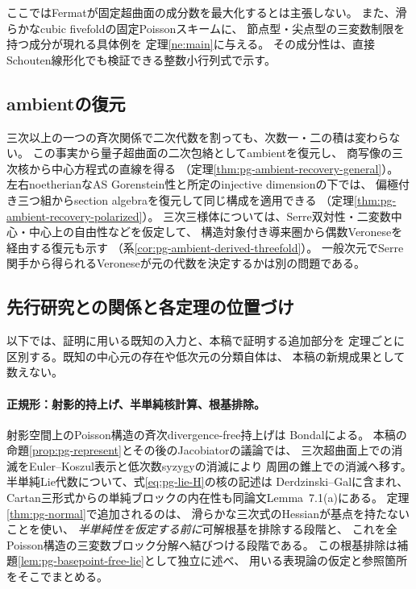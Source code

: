 ここではFermatが固定超曲面の成分数を最大化するとは主張しない。
また、滑らかなcubic fivefoldの固定Poissonスキームに、
節点型・尖点型の三変数制限を持つ成分が現れる具体例を
定理\ref{ne:main}に与える。
その成分性は、直接Schouten線形化でも検証できる整数小行列式で示す。

\subsection*{ambientの復元}
三次以上の一つの斉次関係で二次代数を割っても、次数一・二の積は変わらない。
この事実から量子超曲面の二次包絡としてambientを復元し、
商写像の三次核から中心方程式の直線を得る
（定理\ref{thm:pg-ambient-recovery-general}）。
左右noetherianなAS Gorenstein性と所定のinjective dimensionの下では、
偏極付き三つ組からsection algebraを復元して同じ構成を適用できる
（定理\ref{thm:pg-ambient-recovery-polarized}）。
三次三様体については、Serre双対性・二変数中心・中心上の自由性などを仮定して、
構造対象付き導来圏から偶数Veroneseを経由する復元も示す
（系\ref{cor:pg-ambient-derived-threefold}）。
一般次元でSerre関手から得られるVeroneseが元の代数を決定するかは別の問題である。

\subsection*{先行研究との関係と各定理の位置づけ}
以下では、証明に用いる既知の入力と、本稿で証明する追加部分を
定理ごとに区別する。既知の中心元の存在や低次元の分類自体は、
本稿の新規成果として数えない。

\paragraph{正規形：射影的持上げ、半単純核計算、根基排除。}
射影空間上のPoisson構造の斉次divergence-free持上げは
Bondal\cite[\S4, pp.~11--12]{PBondal93}による。
本稿の命題\ref{prop:pg-represent}とその後のJacobiatorの議論では、
三次超曲面上での消滅をEuler--Koszul表示と低次数syzygyの消滅により
周囲の錐上での消滅へ移す。
半単純Lie代数について、式\eqref{eq:pg-lie-H}の核の記述は
Derdzinski--Gal\cite[(1.4), Theorem~B]{PDerdzinskiGal}に含まれ、
Cartan三形式からの単純ブロックの内在性も同論文Lemma~7.1(a)にある。
定理\ref{thm:pg-normal}で追加されるのは、
滑らかな三次式のHessianが基点を持たないことを使い、
\emph{半単純性を仮定する前に}可解根基を排除する段階と、
これを全Poisson構造の三変数ブロック分解へ結びつける段階である。
この根基排除は補題\ref{lem:pg-basepoint-free-lie}として独立に述べ、
用いる表現論の仮定と参照箇所をそこでまとめる。

